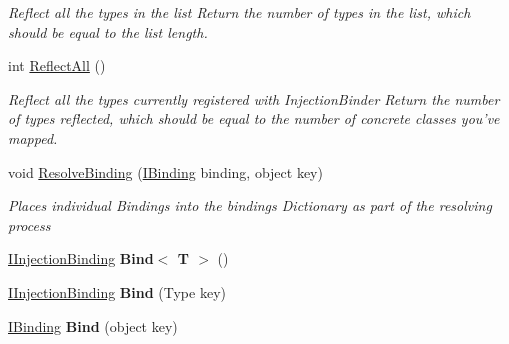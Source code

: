 \begin{DoxyCompactItemize}
\begin{DoxyCompactList}\small\item\em Reflect all the types in the list Return the number of types in the list, which should be equal to the list length. \end{DoxyCompactList}\item 
int \hyperlink{interfacestrange_1_1extensions_1_1injector_1_1api_1_1_i_injection_binder_a4f5f1efc3286ca4358d6ca9443c0f1d2}{Reflect\-All} ()
\begin{DoxyCompactList}\small\item\em Reflect all the types currently registered with Injection\-Binder Return the number of types reflected, which should be equal to the number of concrete classes you've mapped. \end{DoxyCompactList}\item 
void \hyperlink{interfacestrange_1_1extensions_1_1injector_1_1api_1_1_i_injection_binder_a15c29624d07058e29487fa0713b806a3}{Resolve\-Binding} (\hyperlink{interfacestrange_1_1framework_1_1api_1_1_i_binding}{I\-Binding} binding, object key)
\begin{DoxyCompactList}\small\item\em Places individual Bindings into the bindings Dictionary as part of the resolving process \end{DoxyCompactList}\item 
\hypertarget{interfacestrange_1_1extensions_1_1injector_1_1api_1_1_i_injection_binder_a7faee07278ae6f408125b2f5bfe3e380}{\hyperlink{interfacestrange_1_1extensions_1_1injector_1_1api_1_1_i_injection_binding}{I\-Injection\-Binding} {\bfseries Bind$<$ T $>$} ()}\label{interfacestrange_1_1extensions_1_1injector_1_1api_1_1_i_injection_binder_a7faee07278ae6f408125b2f5bfe3e380}

\item 
\hypertarget{interfacestrange_1_1extensions_1_1injector_1_1api_1_1_i_injection_binder_afd394dfe8af8c8678ba48e7badf55f8f}{\hyperlink{interfacestrange_1_1extensions_1_1injector_1_1api_1_1_i_injection_binding}{I\-Injection\-Binding} {\bfseries Bind} (Type key)}\label{interfacestrange_1_1extensions_1_1injector_1_1api_1_1_i_injection_binder_afd394dfe8af8c8678ba48e7badf55f8f}

\item 
\hypertarget{interfacestrange_1_1extensions_1_1injector_1_1api_1_1_i_injection_binder_a5602ebd8283eb4d8a44a3346cd56be81}{\hyperlink{interfacestrange_1_1framework_1_1api_1_1_i_binding}{I\-Binding} {\bfseries Bind} (object key)}\label{interfacestrange_1_1extensions_1_1injector_1_1api_1_1_i_injection_binder_a5602ebd8283eb4d8a44a3346cd56be81}


\end{DoxyCompactItemize}
